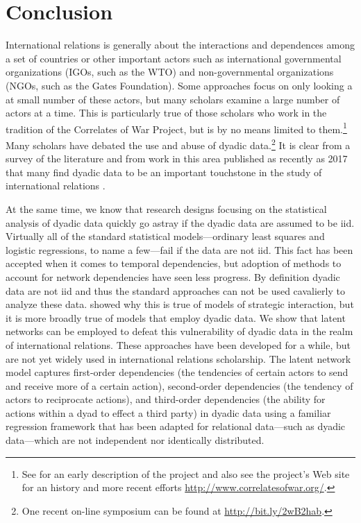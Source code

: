 \section{\textbf{Conclusion}}

International relations is generally about the interactions and dependences among a set of countries or other important actors such as international governmental organizations (IGOs, such as the WTO) and non-governmental organizations (NGOs, such as the Gates Foundation).  Some approaches focus on only looking a at small number of these actors, but many scholars examine a large number of actors at a time. This is particularly true of those scholars who work in the tradition of the Correlates of War Project, but is by no means limited to them.\footnote{See \cite{singer:1972} for an early description of the project and also see the project's Web site for an history and more recent efforts \url{http://www.correlatesofwar.org/}.} Many scholars have debated the use and abuse of dyadic data.\footnote{One recent on-line symposium can be found at \url{http://bit.ly/2wB2hab}.} It is clear from a survey of the literature and from work in this area published as recently as 2017 that many find dyadic data to be an important touchstone in the study of international relations \citep{erikson:pinto:2014,aronow:etal:2015}.

At the same time, we know that research designs focusing on the statistical analysis of dyadic data quickly go astray if the dyadic data are assumed to be iid.  Virtually all of the standard statistical models---ordinary least squares and logistic regressions, to name a few---fail if the data are not iid. This fact has been accepted when it comes to temporal dependencies, but adoption of methods to account for network dependencies have seen less progress. By definition dyadic data are not iid and thus the standard approaches can not be used cavalierly to analyze these data.  \citet{signorino:1999} showed why this is true of models of strategic interaction, but it is more broadly true of models that employ dyadic data.  We show that latent networks can be employed to defeat this vulnerability of dyadic data in the realm of international relations. These approaches have been developed for a while, but are not yet widely used in international relations scholarship.  The latent network model captures first-order dependencies (the tendencies of certain actors to send and receive more of a certain action), second-order dependencies (the tendency of actors to reciprocate actions), and third-order dependencies (the ability for actions within a dyad to effect a third party) in dyadic data using a familiar regression framework that has been adapted for relational data---such as dyadic data---which are not independent nor identically distributed.

